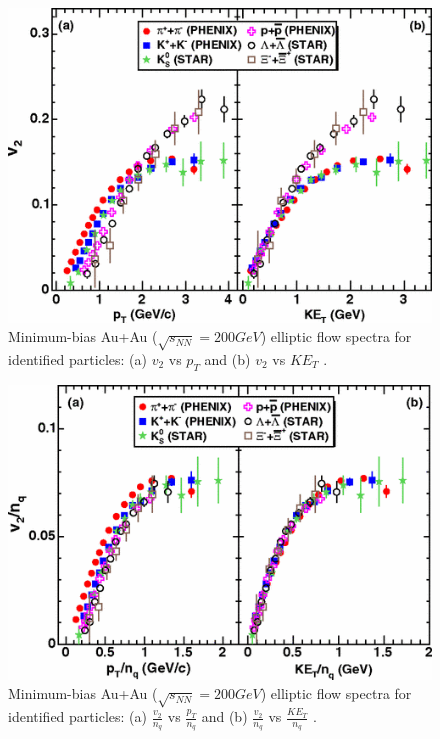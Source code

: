 	\begin{figure}[h]
	  \centering
	  \includegraphics[width=4.5in]{figures/v2Scaling1.png}
	  \caption{Minimum-bias Au+Au ($\sqrt{s_{NN}} = 200 GeV$) elliptic flow spectra for identified particles: (a) $v_{2}$ vs $p_{T}$ and (b) $v_{2}$ vs $KE_{T}$ \cite{2007PhRvL..98p2301A}.}\label{fig:v2Scaling1}
	\end{figure}
	
	\begin{figure}[h]
	  \centering
	  \includegraphics[width=4.5in]{figures/v2Scaling2.png}
	  \caption{Minimum-bias Au+Au ($\sqrt{s_{NN}} = 200 GeV$) elliptic flow spectra for identified particles: (a) $\frac{v_{2}}{n_{q}}$ vs $\frac{p_{T}}{n_{q}}$ and (b) $\frac{v_{2}}{n_{q}}$ vs $\frac{KE_{T}}{n_{q}}$ \cite{2007PhRvL..98p2301A}.}\label{fig:v2Scaling2}
	\end{figure}


